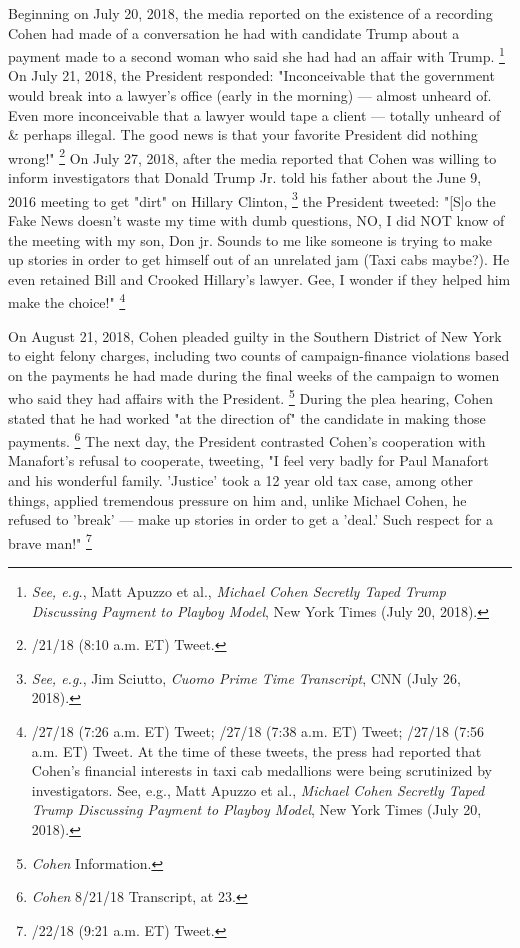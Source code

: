 Beginning on July 20, 2018, the media reported on the existence of a recording Cohen had made of a conversation he had with candidate Trump about a payment made to a second woman who said she had had an affair with Trump.%
\footnote{\textit{See, e.g.}, Matt Apuzzo et al., \textit{Michael Cohen Secretly Taped Trump Discussing Payment to Playboy Model}, New York Times (July 20, 2018).}
On July 21, 2018, the President responded: "Inconceivable that the government would break into a lawyer's office (early in the morning) — almost unheard of.
Even more inconceivable that a lawyer would tape a client — totally unheard of \& perhaps illegal.
The good news is that your favorite President did nothing wrong!"%
\footnote{/21/18 (8:10 a.m. ET) Tweet.}
On July 27, 2018, after the media reported that Cohen was willing to inform investigators that Donald Trump Jr. told his father about the June 9, 2016 meeting to get "dirt" on Hillary Clinton,%
\footnote{\textit{See, e.g.}, Jim Sciutto, \textit{Cuomo Prime Time Transcript}, CNN (July 26, 2018).}
the President tweeted:
"[S]o the Fake News doesn't waste my time with dumb questions, NO, I did NOT know of the meeting with my son, Don jr.
Sounds to me like someone is trying to make up stories in order to get himself out of an unrelated jam (Taxi cabs maybe?).
He even retained Bill and Crooked Hillary's lawyer.
Gee, I wonder if they helped him make the choice!"%
\footnote{/27/18 (7:26 a.m. ET) Tweet;
/27/18 (7:38 a.m. ET) Tweet;
/27/18 (7:56 a.m. ET) Tweet.
At the time of these tweets, the press had reported that Cohen’s financial interests in taxi cab medallions were being scrutinized by investigators.
See, e.g., Matt Apuzzo et al., \textit{Michael Cohen Secretly Taped Trump Discussing Payment to Playboy Model}, New York Times (July 20, 2018).}

On August 21, 2018, Cohen pleaded guilty in the Southern District of New York to eight felony charges, including two counts of campaign-finance violations based on the payments he had made during the final weeks of the campaign to women who said they had affairs with the President.%
\footnote{\textit{Cohen} Information.}
During the plea hearing, Cohen stated that he had worked "at the direction of" the candidate in making those payments.%
\footnote{\textit{Cohen} 8/21/18 Transcript, at 23.}
The next day, the President contrasted Cohen's cooperation with Manafort's refusal to cooperate, tweeting, "I feel very badly for Paul Manafort and his wonderful family.
'Justice' took a 12 year old tax case, among other things, applied tremendous pressure on him and, unlike Michael Cohen, he refused to 'break' — make up stories in order to get a 'deal.'
Such respect for a brave man!"%
\footnote{/22/18 (9:21 a.m. ET) Tweet.}

